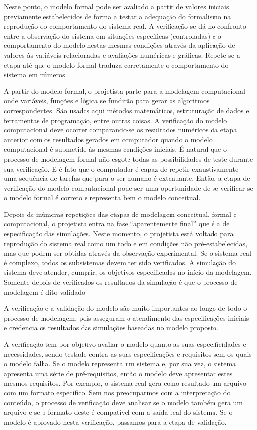 \documentclass[a4paper,12pt,oneside,onecolumn]{uerj/uerj}
\begin{document}
Neste ponto, o modelo formal pode ser avaliado a partir de valores iniciais previamente estabelecidos de forma a testar a adequação do formalismo na reprodução do comportamento do sistema real. A verificação se dá no confronto entre a observação do sistema em situações específicas (controladas) e o comportamento do modelo nestas mesmas condições através da aplicação de valores às variáveis relacionadas e avaliações numéricas e gráficas. Repete-se a etapa até que o modelo formal traduza corretamente o comportamento do sistema em números.

A partir do modelo formal, o projetista parte para a modelagem computacional onde variáveis, funções e lógica se fundirão para gerar os algoritmos correspondentes. São usados aqui métodos matemáticos, estruturação de dados e ferramentas de programação, entre outras coisas. A verificação do modelo computacional deve ocorrer comparando-se os resultados numéricos da etapa anterior com os resultados gerados em computador quando o modelo computacional é submetido às mesmas condições iniciais. É natural que o processo de modelagem formal não esgote todas as possibilidades de teste durante sua verificação. E é fato que o computador é capaz de repetir exaustivamente uma sequência de tarefas que para o ser humano é extenuante. Então, a etapa de verificação do modelo computacional pode ser uma oportunidade de se verificar se o modelo formal é correto e representa bem o modelo conceitual.

Depois de inúmeras repetições das etapas de modelagem conceitual, formal e computacional, o projetista entra na fase ``aparentemente final'' que é a de especificação das simulações. Neste momento, o projetista está voltado para reprodução do sistema real como um todo e em condições não pré-estabelecidas, mas que podem ser obtidas através da observação experimental. Se o sistema real é complexo, todos os subsistemas devem ter sido verificados. A simulação do sistema deve atender, cumprir, os objetivos especificados no início da modelagem. Somente depois de verificados os resultados da simulação é que o processo de modelagem é dito validado.

A verificação e a validação do modelo são muito importantes ao longo de todo o processo de modelagem, pois asseguram o atendimento das especificações iniciais e credencia os resultados das simulações baseadas no modelo proposto. 

A verificação tem por objetivo avaliar o modelo quanto as suas especificidades e necessidades, sendo testado contra as suas especificações e requisitos sem os quais o modelo falha. Se o modelo representa um sistema e, por sua vez, o sistema apresenta uma série de pré-requisitos, então o modelo deve apresentar estes mesmos requisitos. Por exemplo, o sistema real gera como resultado um arquivo com um formato específico. Sem nos preocuparmos com a interpretação do conteúdo, o processo de verificação deve analisar se o modelo também gera um arquivo e se o formato deste é compatível com a saída real do sistema. Se o modelo é aprovado nesta verificação, passamos para a etapa de validação.
\end{document}

